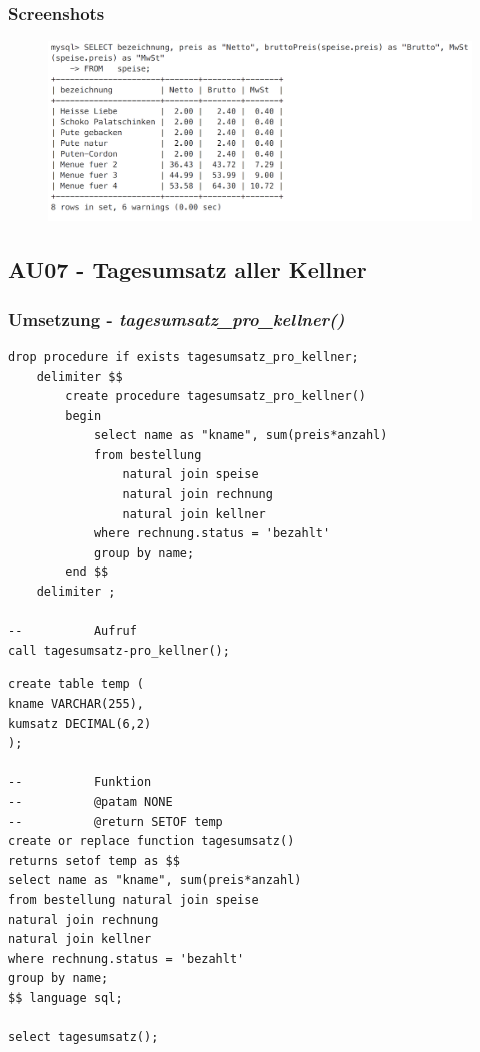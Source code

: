 \subsubsection{Screenshots}
\vspace{0.2cm}
	\begin{figure}[!h]
		\begin{center}
			\includegraphics[width=0.65\linewidth]{images/s07.png}
		\end{center}
	\end{figure}

\clearpage

\subsection{AU07 - Tagesumsatz aller Kellner}
\subsubsection{Umsetzung - \textit{tagesumsatz\_pro\_kellner()}}
\vspace{0.3cm}
\begin{minipage}{.5\textwidth}
	\begin{lstlisting}[style=sql1, caption={tagesumsatzK() - MySQL}]
drop procedure if exists tagesumsatz_pro_kellner;
	delimiter $$
		create procedure tagesumsatz_pro_kellner()
		begin
			select name as "kname", sum(preis*anzahl)
			from bestellung 
				natural join speise 
				natural join rechnung
				natural join kellner
			where rechnung.status = 'bezahlt'
			group by name;
		end $$
	delimiter ;

-- 			Aufruf
call tagesumsatz-pro_kellner();
	\end{lstlisting}
\end{minipage}%
\begin{minipage}{.5\textwidth}
	\begin{lstlisting}[style=sql, caption={tagesumsatzK() - PSQL}]
create table temp (
kname VARCHAR(255),
kumsatz DECIMAL(6,2)
);

--          Funktion
--          @patam NONE
--          @return SETOF temp
create or replace function tagesumsatz()
returns setof temp as $$
select name as "kname", sum(preis*anzahl)
from bestellung natural join speise 
natural join rechnung
natural join kellner
where rechnung.status = 'bezahlt'
group by name;
$$ language sql;

select tagesumsatz();
	\end{lstlisting}
\end{minipage}

